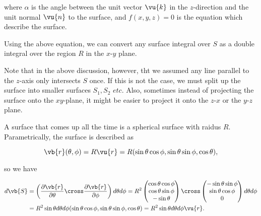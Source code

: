 \documentclass[english,a4paper,12pt]{report}
\begin{document}
where \(\alpha \) is the angle between the unit vector \(\vu{k} \) in the \(z\)-direction and the unit normal \(\vu{n} \) to the surface, and \(f(x,y,z)=0\) is the equation which describe the surface.


Using the above equation, we can convert any surface integral over \(S\) as a double integral over the region \(R\) in the \(x\)-\(y\) plane.

Note that in the above discussion, however, tht we assumed any line parallel to the \(z\)-axis only intersects \(S\) once. If this is not the case, we must split up the surface into smaller surfaces \(S_1, S_2 \textit{ etc.}\) Also, sometimes instead of projecting the surface onto the \(xy\)-plane, it might be easier to project it onto the \(z\)-\(x\) or the \(y\)-\(z\) plane.     

A surface that comes up all the time is a spherical surface with raidus \(R\). Parametrically, the surface is described as 

\begin{equation}
	\vb{r} (\theta ,\phi ) = R \vu{r} = R(\sin \theta \cos \phi , \sin \theta \sin \phi , \cos \theta ),
\end{equation}

so we have  

\begin{equation}
	\begin{aligned} 
	d\vb{S} &= \left( \frac{\partial \vb{r} }{\partial \theta }  \cross \frac{\partial \vb{r} }{\partial \phi }   \right) d \theta d\phi = R^2 \begin{pmatrix}
		 \cos \theta \cos \phi  \\
		 \cos \theta \sin \phi  \\
		 -\sin \theta  \\
	\end{pmatrix} \cross \begin{pmatrix}
		 -\sin \theta \sin \phi  \\
		 \sin \theta \cos \phi  \\
		 0 \\
	\end{pmatrix} d \theta d \phi \\
	&= R^2 \sin \theta d \theta d\phi  (\sin \theta \cos \phi , \sin \theta \sin \phi , \cos \theta ) = R^2\sin \theta d \theta d\phi \vu{r} .
	\end{aligned} 
\end{equation}
\end{document}
